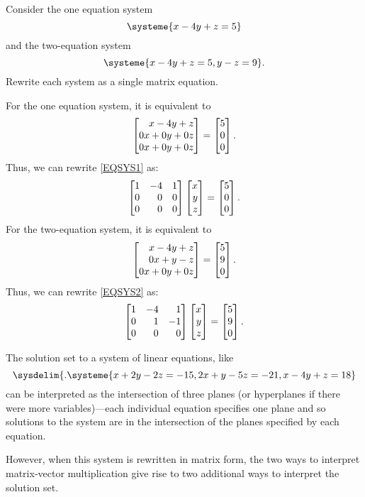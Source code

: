 \begin{example}
	Consider the one equation system
	\begin{equation}
		\label{EQSYS1}
		\systeme{x-4y+z=5}
	\end{equation}
	and the two-equation system
	\begin{equation}
		\label{EQSYS2}
		\systeme{x-4y+z=5, y-z=9}.
	\end{equation}
	Rewrite each system as a single matrix equation.

	For the one equation system, it is equivalent to
	\[
	    \mat{x-4y+z\\0x+0y+0z\\0x+0y+0z}=\mat{5\\0\\0}.
	\]
	Thus, we can rewrite \eqref{EQSYS1} as:
	\[
	    \mat{1&-4&1\\0&0&0\\0&0&0}\mat{x\\y\\z}=\mat{5\\0\\0}.
	\]
	For the two-equation system, it is equivalent to
	\[
	     \mat{x-4y+z\\0x+y-z\\0x+0y+0z}=\mat{5\\9\\0}.
	\]
	Thus, we can rewrite \eqref{EQSYS2} as:
	\[
	    \mat{1&-4&1\\0&1&-1\\0&0&0}\mat{x\\y\\z}=\mat{5\\9\\0}.
	\]
\end{example}


The solution set to a system of linear equations, like
\begin{equation}
	\label{EQREGSYSb}
	\sysdelim\{.
		\systeme{
			x+2y-2z=-15,
			2x+y-5z=-21,
			x-4y+z=18
		}
\end{equation}
can be interpreted as the intersection of three planes (or hyperplanes if there were more variables)---each individual equation
specifies one plane and so solutions to the system are in the intersection of the planes specified by each equation.

However, when this system is rewritten in matrix form, the two ways to interpret matrix-vector
multiplication give rise to two additional ways to interpret the solution set.

